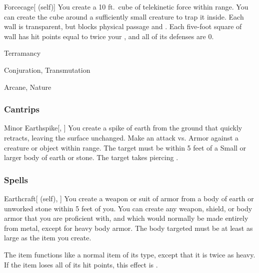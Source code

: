 \lowercase{\hypertarget{spell:Forcecage}{}}\label{spell:Forcecage}
\begin{attuneability}[\nth{7}]{\hypertarget{spell:Forcecage}{Forcecage}}[ (self)]
You create a 10 ft.\ cube of telekinetic force within \rngmed range.
You can create the cube around a sufficiently small creature to trap it inside.
Each wall is transparent, but blocks physical passage and .
Each five-foot square of wall has hit points equal to twice your , and all of its defenses are 0.
\end{attuneability}
\vspace{0.25em}


\newpage
\begin{spellsection}{Terramancy}

\begin{spellheader}
\end{spellheader}


 Conjuration, Transmutation

 Arcane, Nature

\subsubsection{Cantrips}


\begin{freeability}{Minor Earthspike}[, ]
You create a spike of earth from the ground that quickly retracts, leaving the surface unchanged.
Make an attack vs. Armor against a creature or object within \rngmed range.
The target must be within 5 feet of a Small or larger body of earth or stone.
\hit The target takes piercing .
\end{freeability}

\end{spellsection}


\subsubsection{Spells}


\lowercase{\hypertarget{spell:Earthcraft}{}}\label{spell:Earthcraft}
\begin{attuneability}[\nth{1}]{\hypertarget{spell:Earthcraft}{Earthcraft}}[ (self), ]
You create a weapon or suit of armor from a body of earth or unworked stone within 5 feet of you.
You can create any weapon, shield, or body armor that you are proficient with, and which would normally be made entirely from metal, except for heavy body armor.
The body targeted must be at least as large as the item you create.

The item functions like a normal item of its type, except that it is twice as heavy.
If the item loses all of its hit points, this effect is .
\end{attuneability}
\vspace{0.25em}



